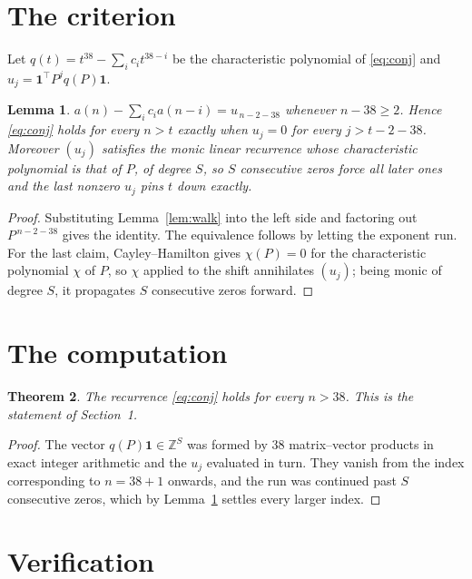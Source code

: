 \documentclass[11pt,a4paper]{article}
\theoremstyle{plain}
\newtheorem{theorem}{Theorem}
\newtheorem{lemma}[theorem]{Lemma}
\theoremstyle{definition}
\begin{document}
\section{The criterion}

Let $q(t)=t^{38}-\sum_i c_i t^{38-i}$ be the characteristic polynomial of
\eqref{eq:conj} and $u_j=\mathbf{1}^{\!\top}P^{j}q(P)\mathbf{1}$.

\begin{lemma}\label{lem:crit}
$a(n)-\sum_i c_i a(n-i)=u_{\,n-2-38}$ whenever $n-38\ge2$. Hence
\eqref{eq:conj} holds for every $n>t$ exactly when $u_j=0$ for every
$j>t-2-38$. Moreover $(u_j)$ satisfies the monic linear recurrence whose
characteristic polynomial is that of $P$, of degree $S$, so $S$ consecutive zeros force all
later ones and the last nonzero $u_j$ pins $t$ down exactly.
\end{lemma}

\begin{proof}
Substituting Lemma~\ref{lem:walk} into the left side and factoring out
$P^{\,n-2-38}$ gives the identity. The equivalence follows by letting the exponent
run. For the last claim, Cayley--Hamilton gives $\chi(P)=0$ for the characteristic
polynomial $\chi$ of $P$, so $\chi$ applied to the shift annihilates $(u_j)$; being monic of
degree $S$, it propagates $S$ consecutive zeros forward.
\end{proof}

\section{The computation}

\begin{theorem}
The recurrence \eqref{eq:conj} holds for every $n>38$. This is the statement of
Section~1.
\end{theorem}

\begin{proof}
The vector $q(P)\mathbf{1}\in\mathbb{Z}^{S}$ was formed by $38$ matrix--vector
products in exact integer arithmetic and the $u_j$ evaluated in turn. They vanish from the
index corresponding to $n=38+1$ onwards, and the run was continued past $S$ consecutive
zeros, which by Lemma~\ref{lem:crit} settles every larger index.
\end{proof}

\section{Verification}
\end{document}
